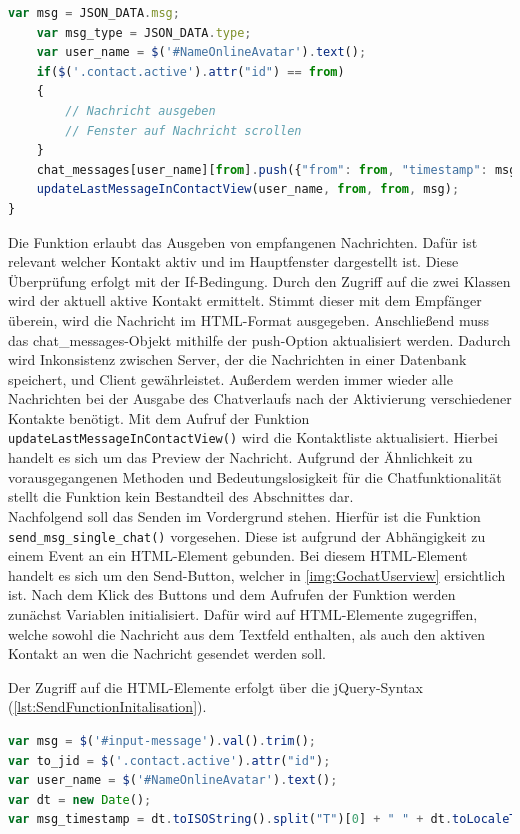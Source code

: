 \documentclass[a4paper,titlepage,halfparskip,12pt]{scrreprt}
\begin{document}
\begin{onehalfspacing}
\begin{lstlisting}[language=Javascript,caption=Funktion und Datenverarbeitung des JSON-Objektes ,label={lst:printSingleMessagesFunction}]
	var msg = JSON_DATA.msg;
	var msg_type = JSON_DATA.type;
	var user_name = $('#NameOnlineAvatar').text(); 
	if($('.contact.active').attr("id") == from) 
	{
		// Nachricht ausgeben
		// Fenster auf Nachricht scrollen
	}
	chat_messages[user_name][from].push({"from": from, "timestamp": msg_timestamp, "txt": msg, "type": "chat"});
	updateLastMessageInContactView(user_name, from, from, msg);
}
\end{lstlisting}
Die Funktion erlaubt das Ausgeben von empfangenen Nachrichten. Dafür ist relevant welcher Kontakt aktiv und im Hauptfenster dargestellt ist. Diese Überprüfung erfolgt mit der If-Bedingung. Durch den Zugriff auf die zwei Klassen wird der aktuell aktive Kontakt ermittelt. Stimmt dieser mit dem Empfänger überein, wird die Nachricht im HTML-Format ausgegeben. Anschließend muss das chat\_messages-Objekt mithilfe der push-Option aktualisiert werden. Dadurch wird Inkonsistenz zwischen Server, der die Nachrichten in einer Datenbank speichert, und Client gewährleistet. Außerdem werden immer wieder alle Nachrichten bei der Ausgabe des Chatverlaufs nach der Aktivierung verschiedener Kontakte benötigt. Mit dem Aufruf der Funktion \texttt{updateLastMessageInContactView()} wird die Kontaktliste aktualisiert. Hierbei handelt es sich um das Preview der Nachricht. Aufgrund der Ähnlichkeit zu vorausgegangenen Methoden und Bedeutungslosigkeit für die Chatfunktionalität stellt die Funktion kein Bestandteil des Abschnittes dar. \\
Nachfolgend soll das Senden im Vordergrund stehen. Hierfür ist die Funktion \texttt{send\_msg\_single\_chat()} vorgesehen. Diese ist aufgrund der Abhängigkeit zu einem Event an ein \ac{HTML}-Element gebunden. Bei diesem \ac{HTML}-Element handelt es sich um den \glqq Send\grqq-Button, welcher in \autoref{img:GochatUserview} ersichtlich ist. Nach dem Klick des Buttons und dem Aufrufen der Funktion werden zunächst Variablen initialisiert. Dafür wird auf \ac{HTML}-Elemente zugegriffen, welche sowohl die Nachricht aus dem Textfeld enthalten, als auch den aktiven Kontakt an wen die Nachricht gesendet werden soll.

Der Zugriff auf die \ac{HTML}-Elemente erfolgt über die jQuery-Syntax (\autoref{lst:SendFunctionInitalisation}).
\begin{lstlisting}[language=Javascript,caption=Initialisierung der Variablen zum Senden einer Nachricht ,label={lst:SendFunctionInitalisation}]
var msg = $('#input-message').val().trim();
var to_jid = $('.contact.active').attr("id");
var user_name = $('#NameOnlineAvatar').text();
var dt = new Date();
var msg_timestamp = dt.toISOString().split("T")[0] + " " + dt.toLocaleTimeString().substring(0,5); 
\end{lstlisting}


\end{onehalfspacing}
\end{document}
